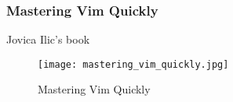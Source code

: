 \begin{frame}[fragile]
  \frametitle{Mastering Vim Quickly}
  Jovica Ilic's book~\cite{ilic2018mastering}
  \begin{figure}
    \centering
    \texttt{[image: mastering\_vim\_quickly.jpg]}
    \caption{Mastering Vim Quickly}
    \label{fig:mastering-vim-quickly}
  \end{figure}
\end{frame}
